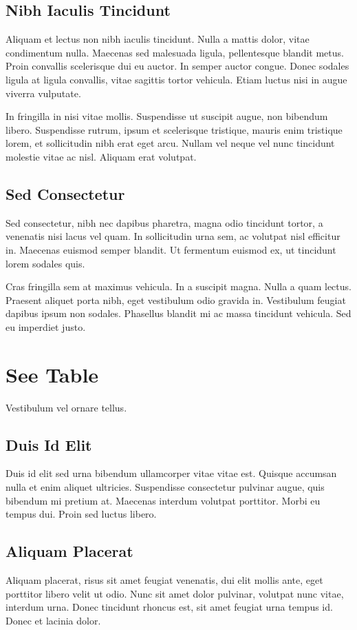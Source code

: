 \documentclass{article}
\begin{document}
\subsection{Nibh Iaculis Tincidunt}
Aliquam et lectus non nibh iaculis tincidunt. 
Nulla a mattis dolor, vitae condimentum nulla. 
Maecenas sed malesuada ligula, pellentesque blandit metus. 
Proin convallis scelerisque dui eu auctor. 
In semper auctor congue. 
Donec sodales ligula at ligula convallis, vitae sagittis tortor vehicula. 
Etiam luctus nisi in augue viverra vulputate. 


In fringilla in nisi vitae mollis. 
Suspendisse ut suscipit augue, non bibendum libero. 
Suspendisse rutrum, ipsum et scelerisque tristique, mauris enim tristique lorem, et sollicitudin nibh erat eget arcu. 
Nullam vel neque vel nunc tincidunt molestie vitae ac nisl. 
Aliquam erat volutpat.
\subsection{Sed Consectetur}
Sed consectetur, nibh nec dapibus pharetra, magna odio tincidunt tortor, a venenatis nisi lacus vel quam. 
In sollicitudin urna sem, ac volutpat nisl efficitur in. 
Maecenas euismod semper blandit. 
Ut fermentum euismod ex, ut tincidunt lorem sodales quis. 


Cras fringilla sem at maximus vehicula. 
In a suscipit magna. 
Nulla a quam lectus. 
Praesent aliquet porta nibh, eget vestibulum odio gravida in. 
Vestibulum feugiat dapibus ipsum non sodales. 
Phasellus blandit mi ac massa tincidunt vehicula. 
Sed eu imperdiet justo.
\newpage
\section{See Table}
Vestibulum vel ornare tellus. 
\subsection{Duis Id Elit}
Duis id elit sed urna bibendum ullamcorper vitae vitae est. 
Quisque accumsan nulla et enim aliquet ultricies. 
Suspendisse consectetur pulvinar augue, quis bibendum mi pretium at. 
Maecenas interdum volutpat porttitor. 
Morbi eu tempus dui. 
Proin sed luctus libero.
\subsection{Aliquam Placerat}
Aliquam placerat, risus sit amet feugiat venenatis, dui elit mollis ante, eget porttitor libero velit ut odio. 
Nunc sit amet dolor pulvinar, volutpat nunc vitae, interdum urna. 
Donec tincidunt rhoncus est, sit amet feugiat urna tempus id. 
Donec et lacinia dolor.
\end{document}

